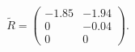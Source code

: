 \documentclass[a4paper,11pt]{article}
\begin{document}
%
%
%
%
%
\begin{equation}\label{key}
	\tilde{R} =
	\begin{pmatrix}
		-1.85& -1.94 \\
		0& -0.04  \\
		0& 0
	\end{pmatrix}.
\end{equation}
\end{document}
